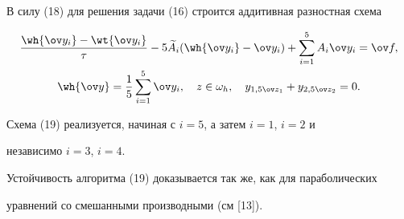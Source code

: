 В силу (18) для решения задачи (16) строится аддитивная разностная схема


\begin{gather}


\frac{{\wh {\ov y_i}}-\wt {\ov y_i}}{\tau}-


5\widetilde A_i(\wh {\ov y_i}-\ov y_i)+\sum_{i=1}^5 A_i\ov y_i=\ov f,\\


%


\wh {\ov y}=\frac{1}{5}\sum_{i=1}^5 \ov y_i,\quad


z\in\omega_h,\quad y_{1, 5\ov z_1}+y_{2, 5\ov z_2}=0.\notag


\end{gather}


Схема (19) реализуется, начиная с $i=5$, а затем $i=1$, $i=2$ и


независимо $i=3$, $i=4$.


Устойчивость алгоритма (19) доказывается так же, как для параболических


уравнений со смешанными производными (см [13]).








